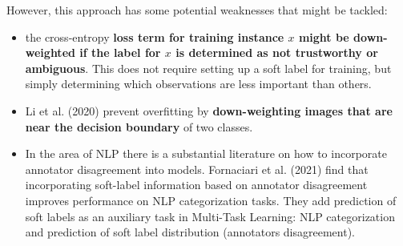 However, this approach has some potential weaknesses that might be tackled:
\begin{itemize}
    \item the cross-entropy \textbf{loss term for training instance $x$ might be down-weighted if the label for $x$ is determined as not trustworthy or ambiguous}. This does not require setting up a soft label for training, but simply determining which observations are less important than others.
    \item Li et al. (2020) prevent overfitting by \textbf{down-weighting images that are near the decision boundary} of two classes.
    \item In the area of NLP there is a substantial literature on how to incorporate annotator disagreement into models. Fornaciari et al. (2021) find that incorporating soft-label information based on annotator disagreement improves performance on NLP categorization tasks. They add prediction of soft labels as an auxiliary task in Multi-Task Learning: NLP categorization and prediction of soft label distribution (annotators disagreement).
\end{itemize}
